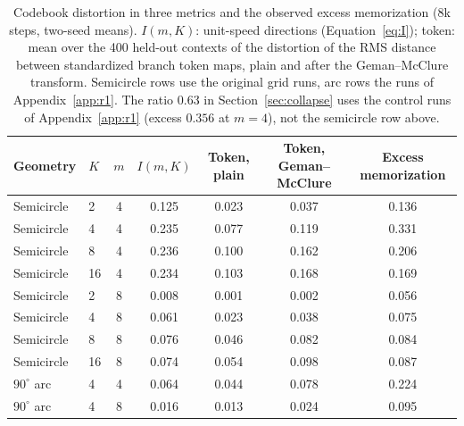 \begin{table}[h]
\caption{Codebook distortion in three metrics and the observed excess memorization (8k steps, two-seed means). $I(m,K)$: unit-speed directions (Equation~\ref{eq:I}); token: mean over the 400 held-out contexts of the distortion of the RMS distance between standardized branch token maps, plain and after the Geman--McClure transform. Semicircle rows use the original grid runs, arc rows the runs of Appendix~\ref{app:r1}. The ratio $0.63$ in Section~\ref{sec:collapse} uses the control runs of Appendix~\ref{app:r1} (excess $0.356$ at $m{=}4$), not the semicircle row above.}
\label{tab:itok}
\begin{center}
\small
\begin{tabular}{llccccc}
\toprule
Geometry & $K$ & $m$ & $I(m,K)$ & Token, plain & Token, Geman--McClure & Excess memorization \\
\midrule
Semicircle & 2 & 4 & 0.125 & 0.023 & 0.037 & 0.136 \\
Semicircle & 4 & 4 & 0.235 & 0.077 & 0.119 & 0.331 \\
Semicircle & 8 & 4 & 0.236 & 0.100 & 0.162 & 0.206 \\
Semicircle & 16 & 4 & 0.234 & 0.103 & 0.168 & 0.169 \\
Semicircle & 2 & 8 & 0.008 & 0.001 & 0.002 & 0.056 \\
Semicircle & 4 & 8 & 0.061 & 0.023 & 0.038 & 0.075 \\
Semicircle & 8 & 8 & 0.076 & 0.046 & 0.082 & 0.084 \\
Semicircle & 16 & 8 & 0.074 & 0.054 & 0.098 & 0.087 \\
$90^\circ$ arc & 4 & 4 & 0.064 & 0.044 & 0.078 & 0.224 \\
$90^\circ$ arc & 4 & 8 & 0.016 & 0.013 & 0.024 & 0.095 \\
\bottomrule
\end{tabular}
\end{center}
\end{table}

\FloatBarrier
